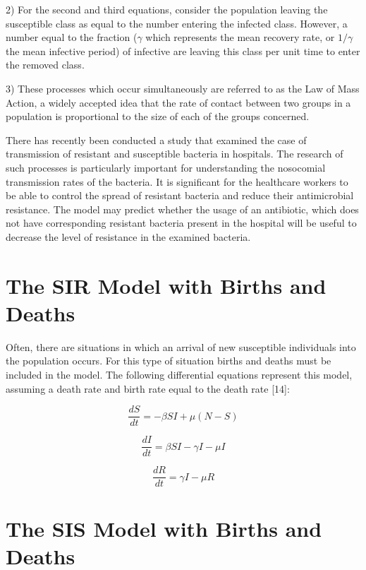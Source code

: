 2) For the second and third equations, consider the population leaving the susceptible class as equal to the number entering the infected class. However, a number equal to the fraction ($\gamma$ which represents the mean recovery rate, or $1/\gamma$ the mean infective period) of infective are leaving this class per unit time to enter the removed class.

3) These processes which occur simultaneously are referred to as the Law of Mass Action, a widely accepted idea that the rate of contact between two groups in a population is proportional to the size of each of the groups concerned\cite{per14}.

There has recently been conducted a study that examined the case of transmission of resistant and susceptible bacteria in hospitals. The research of such processes is particularly important for understanding the nosocomial transmission rates of the bacteria. It is significant for the healthcare workers to be able to control the spread of resistant bacteria and reduce their antimicrobial resistance. The model may predict whether the usage of an antibiotic, which does not have corresponding resistant bacteria present in the hospital will be useful to decrease the level of resistance in the examined bacteria.

\section{The SIR Model with Births and Deaths}
Often, there are situations in which an arrival of new susceptible individuals into the population occurs. For this type of situation births and deaths must be included in the model. The following differential equations represent this model, assuming a death rate   and birth rate equal to the death rate [14]:

\begin{equation}
\frac{dS}{dt} = -\beta S I + \mu(N - S)
\end{equation}

\begin{equation}
\frac{dI}{dt} = \beta S I - \gamma I - \mu I
\end{equation}

\begin{equation}
\frac{dR}{dt} = \gamma I - \mu R
\end{equation}

\section{The SIS Model with Births and Deaths}

